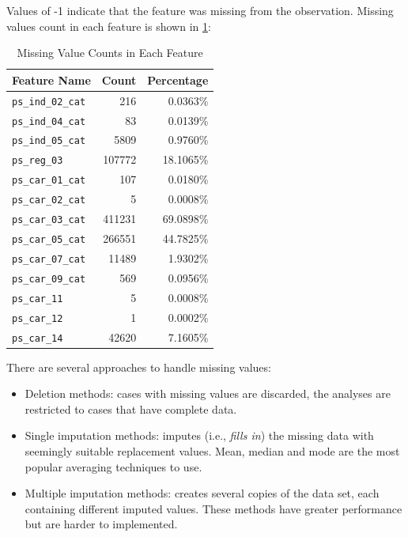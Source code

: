 \documentclass{standalone}
\begin{document}
Values of -1 indicate that the feature was missing from
the observation. Missing values count in each feature is shown in \cref{missing_count}:

\begin{table}[!h]
\renewcommand{\arraystretch}{1.3}
\caption{Missing Value Counts in Each Feature}\label{missing_count}
\centering
\begin{tabular}{l|r|r}
\toprule
\bfseries Feature Name & \bfseries Count & \bfseries Percentage \\
\midrule
\verb|ps_ind_02_cat|  &      216 & 0.0363\%\\
\verb|ps_ind_04_cat|  &       83 & 0.0139\%\\
\verb|ps_ind_05_cat|  &     5809 & 0.9760\%\\
\verb|ps_reg_03|      &   107772 & 18.1065\%\\
\verb|ps_car_01_cat|  &      107 & 0.0180\%\\
\verb|ps_car_02_cat|  &        5 & 0.0008\%\\
\verb|ps_car_03_cat|  &   411231 & 69.0898\%\\
\verb|ps_car_05_cat|  &   266551 & 44.7825\%\\
\verb|ps_car_07_cat|  &    11489 & 1.9302\%\\
\verb|ps_car_09_cat|  &      569 & 0.0956\%\\
\verb|ps_car_11|      &        5 & 0.0008\%\\
\verb|ps_car_12|      &        1 & 0.0002\%\\
\verb|ps_car_14|      &    42620 & 7.1605\%\\
\bottomrule
\end{tabular}
\end{table}

There are several approaches to handle missing values\cite{Intro:Missing}:

\begin{itemize}
\item Deletion methods: cases with missing values are discarded, the analyses are restricted to cases that have
complete data.
\item Single imputation methods: imputes (i.e., \emph{fills in}) the missing data with seemingly suitable replacement values. Mean, median and mode are the most popular averaging techniques to use\cite{Missing:Howto}.
\item Multiple imputation methods: creates several copies of the data set, each containing different
imputed values. These methods have greater performance but are harder to implemented.
\end{itemize}
\end{document}
